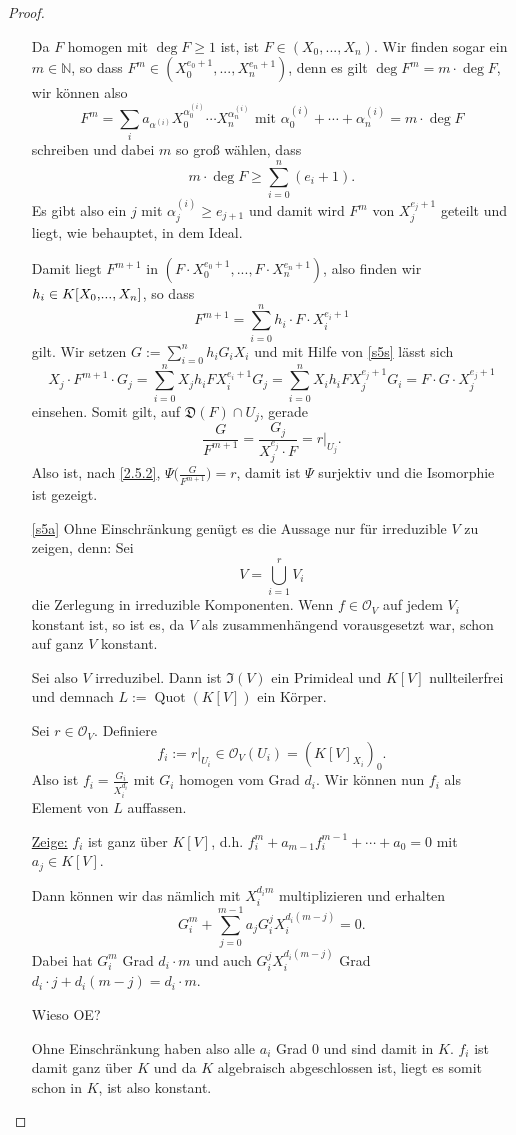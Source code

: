 \documentclass[a4paper,12pt]{scrbook}
\theoremstyle{keinenummern} %
\theoremstyle{mitnummern}
\theoremstyle{unserbeweis}
\newtheorem{proof}{Beweis}
\def\I{\mathfrak{I}}
\def\O{\mathcal{O}}
\newcommand{\D}{\mathfrak{D}}
\newcommand{\Quot}{\operatorname{Quot}}
\newcommand{\restrict}[1]{|_{#1}}
\renewcommand{\dotsc}{\ensuremath{\!...}}
\newcommand{\set}[1]{\ensuremath{\mathbb{#1}}}
\newcommand{\N}{\set{N}}
\newcommand{\ppolyx}[1][n]{\ensuremath%
  [X_{0},\dotsc,X_{#1}]}
\begin{document}
\begin{proof}
\begin{enumerate}
Da $F$ homogen mit $\deg F\geq 1$ ist, ist $F\in(X_{0},\dotsc,X_{n})$. Wir finden sogar ein $m\in\N$, so dass $F^{m}\in(X_{0}^{e_{0}+1},\dotsc,X_{n}^{e_{n}+1})$, denn es gilt $\deg F^{m}=m\cdot\deg F$, wir können also
\[F^{m}=\sum_{i}a_{\alpha^{(i)}}X_{0}^{\alpha_{0}^{(i)}}\dotsm X_{n}^{\alpha_{n}^{(i)}}\text{ mit }\alpha_{0}^{(i)}+\dotsm+\alpha_{n}^{(i)}=m\cdot\deg F\]
schreiben und dabei $m$ so groß wählen, dass
\[m\cdot\deg F\geq\sum_{i=0}^{n}(e_{i}+1).\]
Es gibt also ein $j$ mit $\alpha_{j}^{(i)}\geq e_{j+1}$ und damit wird $F^{m}$ von $X_{j}^{e_{j}+1}$ geteilt und liegt, wie behauptet, in dem Ideal.

Damit liegt $F^{m+1}$ in $(F\cdot X_{0}^{e_{0}+1},\dotsc,F\cdot X_{n}^{e_{n}+1})$, also finden wir $h_{i}\in K\ppolyx$, so dass
\[F^{m+1}=\sum_{i=0}^{n}h_{i}\cdot F\cdot X_{i}^{e_{i}+1}\]
gilt. Wir setzen $\displaystyle G:=\sum_{i=0}^{n}h_{i}G_{i}X_{i}$ und mit Hilfe von \cref{s5s} lässt sich
\[X_{j}\cdot F^{m+1}\cdot G_{j}=\sum_{i=0}^{n}X_{j}h_{i}FX_{i}^{e_{i}+1}G_{j}=\sum_{i=0}^{n}X_{i}h_{i}FX_{j}^{e_{j}+1}G_{i}=F\cdot G\cdot X_{j}^{e_{j}+1}\]
einsehen. Somit gilt, auf $\D(F)\cap U_{j}$, gerade \[\frac{G}{F^{m+1}}=\frac{G_{j}}{X_{j}^{e_{j}}\cdot F}=r\restrict{U_{j}}.\] Also ist, nach \cref{2.5.2}, $\Psi\bigl(\frac{G}{F^{m+1}}\bigr)=r$, damit ist $\Psi$ surjektiv und die Isomorphie ist gezeigt.

\item[\ref{s5a}] Ohne Einschränkung genügt es die Aussage nur für irreduzible $V$ zu zeigen, denn: Sei
\[V=\bigcup_{i=1}^{r}V_{i}\]
die Zerlegung in irreduzible Komponenten. Wenn $f\in\O_{V}$ auf jedem $V_{i}$ konstant ist, so ist es, da $V$ als zusammenhängend vorausgesetzt war, schon auf ganz $V$ konstant.

Sei also $V$ irreduzibel. Dann ist $\I(V)$ ein Primideal und $K[V]$ nullteilerfrei und demnach $L:=\Quot(K[V])$ ein Körper.

Sei $r\in\O_{V}$. Definiere
\[f_{i}:=r\restrict{U_{i}}\in\O_{V}(U_{i})=(K[V]_{X_{i}})_{0}.\]
Also ist $f_{i}=\frac{G_{i}}{X_{i}^{d_{i}}}$ mit $G_{i}$ homogen vom Grad $d_{i}$. Wir können nun $f_{i}$ als Element von $L$ auffassen.

\hyperlink{s5bzz}{{\sc Zeige:}} $f_{i}$ ist ganz über $K[V]$, d.h. $f_{i}^{m}+a_{m-1}f_{i}^{m-1}+\dotsm+a_{0}=0$ mit $a_{j}\in K[V]$.

Dann können wir das nämlich mit $X_{i}^{d_{i}m}$ multiplizieren und erhalten
\[G_{i}^{m}+\sum_{j=0}^{m-1}a_{j}G_{i}^{j}X_{i}^{d_{i}(m-j)}=0.\]
Dabei hat $G_{i}^{m}$ Grad $d_{i}\cdot m$ und auch $G_{i}^{j}X_{i}^{d_{i}(m-j)}$ Grad $d_{i}\cdot j+d_{i}(m-j)=d_{i}\cdot m$.
\begin{w}Wieso OE?\end{w}
Ohne Einschränkung haben also alle $a_{i}$ Grad $0$ und sind damit in $K$. $f_{i}$ ist damit ganz über $K$ und da $K$ algebraisch abgeschlossen ist, liegt es somit schon in $K$, ist also konstant.


\end{enumerate}
\end{proof}
\end{document}

